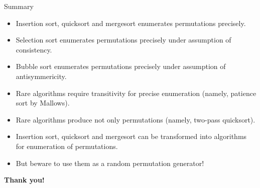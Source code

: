 \documentclass[handout]{beamer}
\begin{document}
\begin{frame}{Summary}

\begin{itemize}

\item Insertion sort, quicksort and mergesort enumerates permutations precisely.

\item Selection sort enumerates permutations precisely under assumption of consistency.

\item Bubble sort enumerates permutations precisely under assumption of antisymmericity.

\item Rare algorithms require transitivity for precise enumeration (namely, patience sort by Mallows).

\item Rare algorithms produce not only permutations (namely, two-pass quicksort).

\item Insertion sort, quicksort and mergesort can be transformed into algorithms for enumeration of permutations.

\item But beware to use them as a random permutation generator!

\end{itemize}

\end{frame}

\begin{frame}
\centerline{\Huge\bf Thank you!}
\end{frame}
\end{document}
